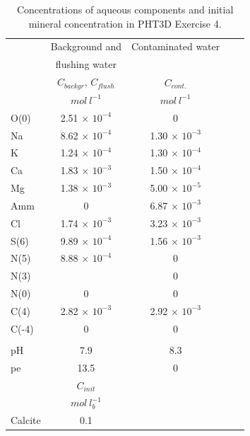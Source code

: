 \begin{table}
\caption{Concentrations of aqueous components and initial mineral concentration in PHT3D Exercise 4.}
\begin{center}
\begin{tabular}{l c c c c }
\toprule
      & \multicolumn{1}{c}{Background and} & \multicolumn{1}{c}{Contaminated water} \\
      & \multicolumn{1}{c}{flushing water} &                & \\
      & \multicolumn{1}{c}{$C_{backgr}$, $C_{flush}$} & \multicolumn{1}{c}{$C_{cont.}$} \\
      &    $mol\ l^{-1}$   & $mol\ l^{-1}$ \\ 
\midrule
O(0)     & 2.51 $\times$ $10^{-4}$    & $0$  \\
Na       & 8.62 $\times$ $10^{-4}$    & 1.30 $\times$ $10^{-3}$ \\
K        & 1.24 $\times$ $10^{-4}$    & 1.30 $\times$ $10^{-4}$ \\
Ca       & 1.83 $\times$ $10^{-3}$    & 1.50 $\times$ $10^{-4}$ \\
Mg       & 1.38 $\times$ $10^{-3}$    & 5.00 $\times$ $10^{-5}$ \\
Amm      & $0$                        & 6.87 $\times$ $10^{-3}$ \\
Cl       & 1.74 $\times$ $10^{-3}$    & 3.23 $\times$ $10^{-3}$ \\
S(6)     & 9.89 $\times$ $10^{-4}$    & 1.56 $\times$ $10^{-3}$ \\
N(5)     & 8.88 $\times$ $10^{-4}$    & $0$ \\
N(3)     &                            & $0$ \\ 
N(0)     &    $0$                     & $0$ \\ 
C(4)     & 2.82 $\times$ $10^{-3}$    & 2.92 $\times$ $10^{-3}$ \\ 
C(-4)    &  $0$                       &   $0$ \\ 
 & & \\
pH    & 7.9               & 8.3             \\
pe    & 13.5              & 0            \\
\midrule 
        &      $C_{init}$       &          \\
                &        $mol\ l_b^{-1}$     &          \\
Calcite &      0.1             &          \\
\bottomrule

\end{tabular}
\label{bruno_caqu}
\end{center}
\end{table}


